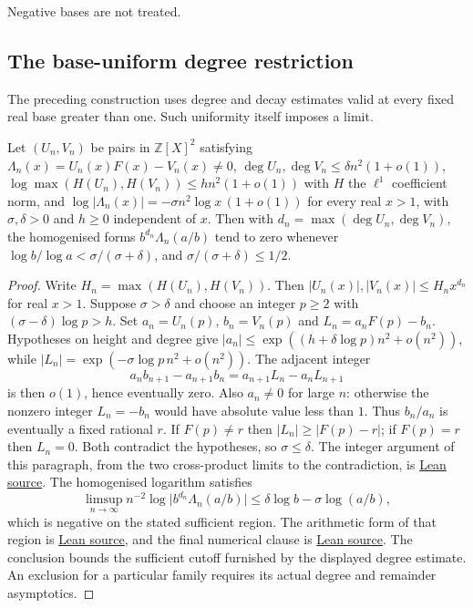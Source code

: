 \documentclass[11pt]{article}
\begin{document}
Negative bases are not treated.

\subsection{The base-uniform degree restriction}
The preceding construction uses degree and decay estimates valid at every
fixed real base greater than one.  Such uniformity itself imposes a limit.

\begin{theorem}
\label{res:archimedean-cap}
Let $(U_n,V_n)$ be pairs in $\mathbb Z[X]^2$ satisfying $\Lambda_n(x)=U_n(x)F(x)-V_n(x)\ne0$,
$\deg U_n,\deg V_n\le\delta n^2(1+o(1))$,
$\log\max(H(U_n),H(V_n))\le h n^2(1+o(1))$ with $H$ the $\ell^1$ coefficient
norm, and
$\log|\Lambda_n(x)|=-\sigma n^2\log x\,(1+o(1))$ for every real $x>1$, with
$\sigma,\delta>0$ and $h\ge0$ independent of $x$.  Then with
$d_n=\max(\deg U_n,\deg V_n)$, the homogenised forms
$b^{d_n}\Lambda_n(a/b)$ tend to zero whenever
$\log b/\log a<\sigma/(\sigma+\delta)$, and $\sigma/(\sigma+\delta)\le1/2$.
\end{theorem}

\begin{proof}
Write $H_n=\max(H(U_n),H(V_n))$.  Then
$|U_n(x)|,|V_n(x)|\le H_n x^{d_n}$ for real $x>1$.
Suppose $\sigma>\delta$ and choose an integer $p\ge2$ with
$(\sigma-\delta)\log p>h$.  Set $a_n=U_n(p)$, $b_n=V_n(p)$ and
$L_n=a_n F(p)-b_n$.  Hypotheses on height and degree give
$|a_n|\le\exp((h+\delta\log p)n^2+o(n^2))$, while
$|L_n|=\exp(-\sigma\log p\,n^2+o(n^2))$.  The adjacent integer
\[
 a_nb_{n+1}-a_{n+1}b_n=a_{n+1}L_n-a_n L_{n+1}
\]
is then $o(1)$, hence eventually zero.  Also $a_n\ne0$ for large $n$:
otherwise the nonzero integer $L_n=-b_n$ would have absolute value less
than $1$.  Thus $b_n/a_n$ is eventually a fixed rational $r$.  If
$F(p)\ne r$ then $|L_n|\ge|F(p)-r|$; if $F(p)=r$ then $L_n=0$.  Both
contradict the hypotheses, so $\sigma\le\delta$.
The integer argument of this paragraph, from the two cross-product limits to
the contradiction, is \href{https://github.com/wcook04/plectis-erdos/blob/f36a98bf3d3e6f65f1074e3b800e3293d5b8a51a/ErdosProblems/Erdos1049/PaperRankTwoCapR7.lean#L123}{Lean source}.
The homogenised logarithm satisfies
\[
 \limsup_{n\to\infty} n^{-2}\log\bigl|b^{d_n}\Lambda_n(a/b)\bigr|
 \le \delta\log b-\sigma\log(a/b),
\]
which is negative on the stated sufficient region.
The arithmetic form of that region is
\href{https://github.com/wcook04/plectis-erdos/blob/f36a98bf3d3e6f65f1074e3b800e3293d5b8a51a/ErdosProblems/Erdos1049/PaperRankTwoCapR7.lean#L144}{Lean source}, and the final numerical clause is
\href{https://github.com/wcook04/plectis-erdos/blob/f36a98bf3d3e6f65f1074e3b800e3293d5b8a51a/ErdosProblems/Erdos1049/PaperRankTwoCapR7.lean#L155}{Lean source}.
The conclusion bounds the
sufficient cutoff furnished by the displayed degree estimate.  An exclusion for a
particular family requires its actual degree and remainder asymptotics.
\end{proof}
\end{document}
